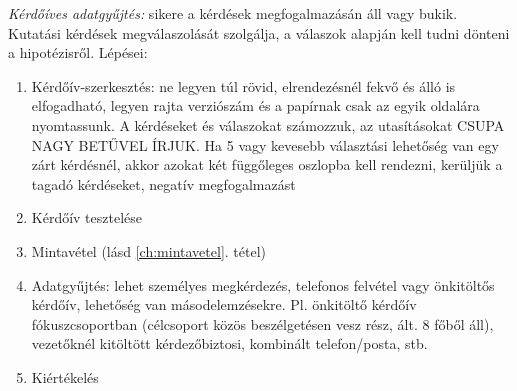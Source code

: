 \emph{Kérdőíves adatgyűjtés:} sikere a kérdések megfogalmazásán áll vagy bukik. Kutatási kérdések megválaszolását szolgálja, a válaszok alapján kell tudni dönteni a hipotézisről. Lépései:
\begin{enumerate}
\item Kérdőív-szerkesztés: ne legyen túl rövid, elrendezésnél fekvő és álló is elfogadható, legyen rajta verziószám és a papírnak csak az egyik oldalára nyomtassunk. A kérdéseket és válaszokat számozzuk, az utasításokat CSUPA NAGY BETŰVEL ÍRJUK. Ha 5 vagy kevesebb választási lehetőség van egy zárt kérdésnél, akkor azokat két függőleges oszlopba kell rendezni, kerüljük a tagadó kérdéseket, negatív megfogalmazást
\item Kérdőív tesztelése
\item Mintavétel (lásd \ref{ch:mintavetel}. tétel)
\item Adatgyűjtés: lehet személyes megkérdezés, telefonos felvétel vagy önkitöltős kérdőív, lehetőség van másodelemzésekre. Pl. önkitöltő kérdőív fókuszcsoportban (célcsoport közös beszélgetésen vesz rész, ált. 8 főből áll), vezetőknél kitöltött kérdezőbiztosi, kombinált telefon/posta, stb.
\item Kiértékelés
\end{enumerate}
